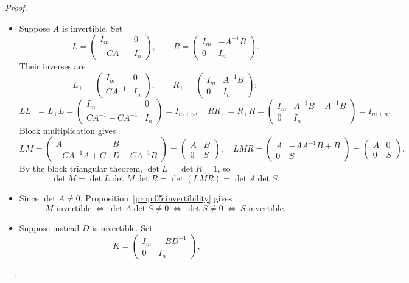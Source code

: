 \begin{proof}
\begin{itemize}
\item Suppose \(A\) is invertible. Set
  \[
  L=\begin{pmatrix}I_m&0\\-CA^{-1}&I_n\end{pmatrix},
  \qquad R=\begin{pmatrix}I_m&-A^{-1}B\\0&I_n\end{pmatrix}.
  \]
  Their inverses are
  \[
  L_+=\begin{pmatrix}I_m&0\\CA^{-1}&I_n\end{pmatrix},\qquad
  R_+=\begin{pmatrix}I_m&A^{-1}B\\0&I_n\end{pmatrix}:
  \]
  \[
  LL_+=L_+L=\begin{pmatrix}I_m&0\\CA^{-1}-CA^{-1}&I_n\end{pmatrix}=I_{m+n},
  \quad
  RR_+=R_+R=\begin{pmatrix}I_m&A^{-1}B-A^{-1}B\\0&I_n\end{pmatrix}=I_{m+n}.
  \]
  Block multiplication gives
  \[
  LM=\begin{pmatrix}A&B\\-CA^{-1}A+C&D-CA^{-1}B\end{pmatrix}
    =\begin{pmatrix}A&B\\0&S\end{pmatrix},
  \quad
  LMR=\begin{pmatrix}A&-AA^{-1}B+B\\0&S\end{pmatrix}
     =\begin{pmatrix}A&0\\0&S\end{pmatrix}.
  \]
  By the block triangular theorem, \(\det L=\det R=1\), so
  \[
  \det M=\det L\det M\det R=\det(LMR)=\det A\det S.
  \]
\item Since \(\det A\ne0\), Proposition~\ref{prop:05:invertibility} gives
  \[
  M\text{ invertible}\ \Longleftrightarrow\ \det A\det S\ne0
  \ \Longleftrightarrow\ \det S\ne0
  \ \Longleftrightarrow\ S\text{ invertible}.
  \]
\item Suppose instead \(D\) is invertible. Set
  \[
  K=\begin{pmatrix}I_m&-BD^{-1}\\0&I_n\end{pmatrix},\qquad
\]
\end{itemize}
\end{proof}
